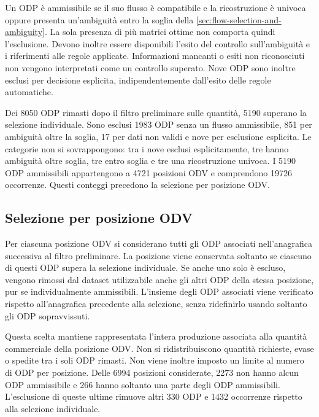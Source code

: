 Un ODP è ammissibile se il suo flusso è compatibile e la ricostruzione è univoca oppure presenta un'ambiguità entro la soglia della \cref{sec:flow-selection-and-ambiguity}. La sola presenza di più matrici ottime non comporta quindi l'esclusione. Devono inoltre essere disponibili l'esito del controllo sull'ambiguità e i riferimenti alle regole applicate. Informazioni mancanti o esiti non riconosciuti non vengono interpretati come un controllo superato. Nove ODP sono inoltre esclusi per decisione esplicita, indipendentemente dall'esito delle regole automatiche.

Dei \num{8050} ODP rimasti dopo il filtro preliminare sulle quantità, \num{5190} superano la selezione individuale. Sono esclusi \num{1983} ODP senza un flusso ammissibile, 851 per ambiguità oltre la soglia, 17 per dati non validi e nove per esclusione esplicita. Le categorie non si sovrappongono: tra i nove esclusi esplicitamente, tre hanno ambiguità oltre soglia, tre entro soglia e tre una ricostruzione univoca. I \num{5190} ODP ammissibili appartengono a \num{4721} posizioni ODV e comprendono \num{19726} occorrenze. Questi conteggi precedono la selezione per posizione ODV.

\subsection{Selezione per posizione ODV}
\label{sec:sales-position-selection}

Per ciascuna posizione ODV si considerano tutti gli ODP associati nell'anagrafica successiva al filtro preliminare. La posizione viene conservata soltanto se ciascuno di questi ODP supera la selezione individuale. Se anche uno solo è escluso, vengono rimossi dal dataset utilizzabile anche gli altri ODP della stessa posizione, pur se individualmente ammissibili. L'insieme degli ODP associati viene verificato rispetto all'anagrafica precedente alla selezione, senza ridefinirlo usando soltanto gli ODP sopravvissuti.

Questa scelta mantiene rappresentata l'intera produzione associata alla quantità commerciale della posizione ODV. Non si ridistribuiscono quantità richieste, evase o spedite tra i soli ODP rimasti. Non viene inoltre imposto un limite al numero di ODP per posizione. Delle \num{6994} posizioni considerate, \num{2273} non hanno alcun ODP ammissibile e 266 hanno soltanto una parte degli ODP ammissibili. L'esclusione di queste ultime rimuove altri 330 ODP e \num{1432} occorrenze rispetto alla selezione individuale.


